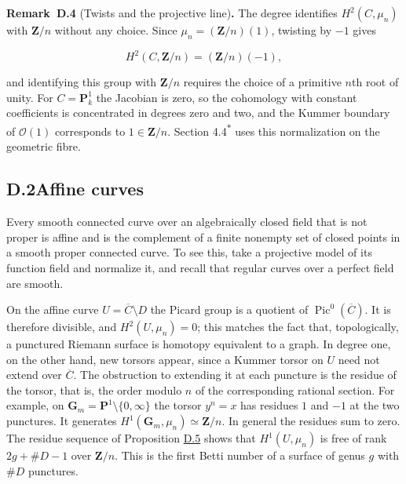 \documentclass[11pt]{article}
\newenvironment{bpstatement}[2]{\par\addvspace{0.6\baselineskip}\noindent\textbf{#1}#2\textbf{.}\enspace\ignorespaces}
  {\par\addvspace{0.4\baselineskip}}
\newcommand{\bpout}[1]{#1\textsuperscript{\hyperlink{bp-outside}{\ensuremath{\ast}}}}
\begin{document}
\label{bp183}%
\begin{bpstatement}{Remark~D.4}{ (Twists and the projective line)}
The degree identifies \(H^2(C,\mu_n)\) with \(\mathbf Z/n\) without any choice. Since \(\mu_n=(\mathbf Z/n)(1)\), twisting by \(-1\) gives

\[
H^2(C,\mathbf Z/n)=(\mathbf Z/n)(-1),
\]

and identifying this group with \(\mathbf Z/n\) requires the choice of a primitive \(n\)th root of unity.  For \(C=\mathbf P^1_k\) the Jacobian is zero, so the cohomology with constant coefficients is concentrated in degrees zero and two, and the Kummer boundary of \(\mathcal O(1)\) corresponds to \(1\in\mathbf Z/n\). Section \bpout{4.4} uses this normalization on the geometric fibre.
\end{bpstatement}


\subsection*{\texorpdfstring{D.2\quad Affine curves}{D.2 Affine curves}}
\label{bp184}%
\label{bp185}%
Every smooth connected curve over an algebraically closed field that is not proper is affine and is the complement of a finite nonempty set of closed points in a smooth proper connected curve.  To see this, take a projective model of its function field and normalize it, and recall that regular curves over a perfect field are smooth.

On the affine curve \(U=\overline C\setminus D\) the Picard group is a quotient of \(\operatorname{Pic}^0(\overline C)\). It is therefore divisible, and \(H^2(U,\mu_n)=0\); this matches the fact that, topologically, a punctured Riemann surface is homotopy equivalent to a graph. In degree one, on the other hand, new torsors appear, since a Kummer torsor on \(U\) need not extend over \(\overline C\). The obstruction to extending it at each puncture is the residue of the torsor, that is, the order modulo \(n\) of the corresponding rational section. For example, on \(\mathbf G_m=\mathbf P^1\setminus\{0,\infty\}\) the torsor \(y^n=x\) has residues \(1\) and \(-1\) at the two punctures. It generates \(H^1(\mathbf G_m,\mu_n)\simeq\mathbf Z/n\). In general the residues sum to zero. The residue sequence of Proposition \hyperref[bp186]{D.5} shows that \(H^1(U,\mu_n)\) is free of rank \(2g+\#D-1\) over \(\mathbf Z/n\). This is the first Betti number of a surface of genus \(g\) with \(\#D\) punctures.
\end{document}
